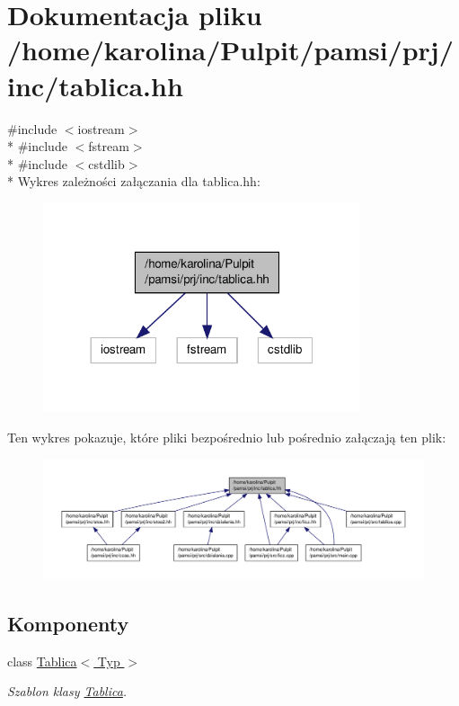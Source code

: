 \hypertarget{tablica_8hh}{\section{Dokumentacja pliku /home/karolina/\-Pulpit/pamsi/prj/inc/tablica.hh}
\label{tablica_8hh}
}
{\ttfamily \#include $<$iostream$>$}\\*
{\ttfamily \#include $<$fstream$>$}\\*
{\ttfamily \#include $<$cstdlib$>$}\\*
Wykres zależności załączania dla tablica.\-hh\-:\nopagebreak
\begin{figure}[H]
\begin{center}
\leavevmode
\includegraphics[width=264pt]{tablica_8hh__incl}
\end{center}
\end{figure}
Ten wykres pokazuje, które pliki bezpośrednio lub pośrednio załączają ten plik\-:
\nopagebreak
\begin{figure}[H]
\begin{center}
\leavevmode
\includegraphics[width=350pt]{tablica_8hh__dep__incl}
\end{center}
\end{figure}
\subsection*{Komponenty}
\begin{DoxyCompactItemize}
\item 
class \hyperlink{class_tablica}{Tablica$<$ Typ $>$}
\begin{DoxyCompactList}\small\item\em Szablon klasy \hyperlink{class_tablica}{Tablica}. \end{DoxyCompactList}\end{DoxyCompactItemize}
